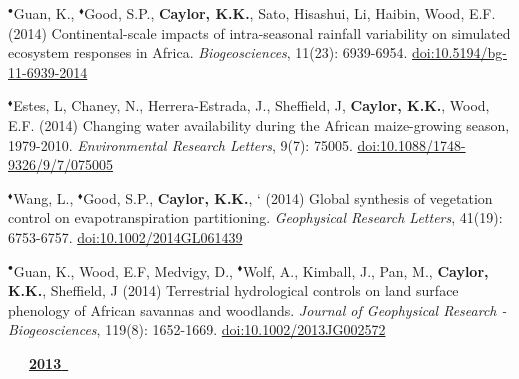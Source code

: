 \begin{etaremune}
\item $^{\bullet}$Guan, K., $^{\blacklozenge}$Good, S.P., \textbf{ Caylor, K.K.}, Sato, Hisashui, Li, Haibin, Wood, E.F. (2014) Continental-scale impacts of intra-seasonal rainfall variability on simulated ecosystem responses in Africa. \emph{Biogeosciences}, 11(23): 6939-6954. \href{https://doi.org/10.5194/bg-11-6939-2014}{doi:10.5194/bg-11-6939-2014}
\item $^{\blacklozenge}$Estes, L, Chaney, N., Herrera-Estrada, J., Sheffield, J, \textbf{ Caylor, K.K.}, Wood, E.F. (2014) Changing water availability during the African maize-growing season, 1979-2010. \emph{Environmental Research Letters}, 9(7): 75005. \href{https://doi.org/10.1088/1748-9326/9/7/075005}{doi:10.1088/1748-9326/9/7/075005}
\item $^{\blacklozenge}$Wang, L., $^{\blacklozenge}$Good, S.P., \textbf{ Caylor, K.K.}, ` (2014) Global synthesis of vegetation control on evapotranspiration partitioning. \emph{Geophysical Research Letters}, 41(19): 6753-6757. \href{https://doi.org/10.1002/2014GL061439}{doi:10.1002/2014GL061439}
\item $^{\bullet}$Guan, K., Wood, E.F, Medvigy, D., $^{\blacklozenge}$Wolf, A., Kimball, J., Pan, M., \textbf{ Caylor, K.K.}, Sheffield, J (2014) Terrestrial hydrological controls on land surface phenology of African savannas and woodlands. \emph{Journal of Geophysical Research - Biogeosciences}, 119(8): 1652-1669. \href{https://doi.org/10.1002/2013JG002572}{doi:10.1002/2013JG002572}

\vspace{0.1in}
\mbox{\ \ \ \underline{\textbf{2013 }}}
\vspace{0.1in}


\end{etaremune}
